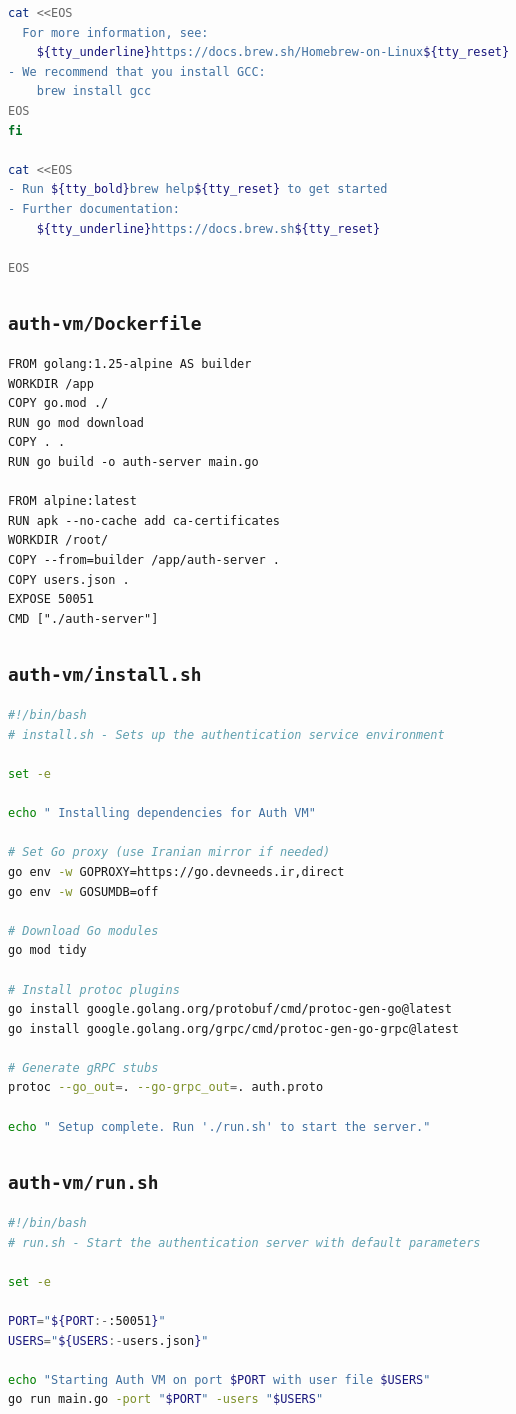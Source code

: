 \documentclass[a4paper]{article}
\begin{document}
\begin{lstlisting}[language=bash, caption=auth-vm/brew_install.sh]
  cat <<EOS
  For more information, see:
    ${tty_underline}https://docs.brew.sh/Homebrew-on-Linux${tty_reset}
- We recommend that you install GCC:
    brew install gcc
EOS
fi

cat <<EOS
- Run ${tty_bold}brew help${tty_reset} to get started
- Further documentation:
    ${tty_underline}https://docs.brew.sh${tty_reset}

EOS

\end{lstlisting}

\subsection{\texttt{auth-vm/Dockerfile}}
\begin{lstlisting}[language=docker, caption=auth-vm/Dockerfile]
FROM golang:1.25-alpine AS builder
WORKDIR /app
COPY go.mod ./
RUN go mod download
COPY . .
RUN go build -o auth-server main.go

FROM alpine:latest
RUN apk --no-cache add ca-certificates
WORKDIR /root/
COPY --from=builder /app/auth-server .
COPY users.json .
EXPOSE 50051
CMD ["./auth-server"]
\end{lstlisting}

\subsection{\texttt{auth-vm/install.sh}}
\begin{lstlisting}[language=bash, caption=auth-vm/install.sh]
#!/bin/bash
# install.sh - Sets up the authentication service environment

set -e

echo " Installing dependencies for Auth VM"

# Set Go proxy (use Iranian mirror if needed)
go env -w GOPROXY=https://go.devneeds.ir,direct
go env -w GOSUMDB=off

# Download Go modules
go mod tidy

# Install protoc plugins
go install google.golang.org/protobuf/cmd/protoc-gen-go@latest
go install google.golang.org/grpc/cmd/protoc-gen-go-grpc@latest

# Generate gRPC stubs
protoc --go_out=. --go-grpc_out=. auth.proto

echo " Setup complete. Run './run.sh' to start the server."
\end{lstlisting}

\subsection{\texttt{auth-vm/run.sh}}
\begin{lstlisting}[language=bash, caption=auth-vm/run.sh]
#!/bin/bash
# run.sh - Start the authentication server with default parameters

set -e

PORT="${PORT:-:50051}"
USERS="${USERS:-users.json}"

echo "Starting Auth VM on port $PORT with user file $USERS"
go run main.go -port "$PORT" -users "$USERS"
\end{lstlisting}
\end{document}

